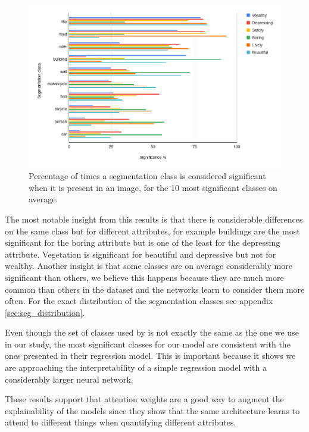 \begin{figure}[ht]
	\begin{center}
	\includegraphics[width=1\textwidth]{./figures/present_significance.png}
	\caption[Percentage of class significance when present]{
		Percentage of times a segmentation class is considered significant when it is present in an image, for the
		10 most significant classes on average.
        }
	\label{fig:presence_sig}
	\end{center}
\end{figure}


The most notable insight from this results is that there is considerable differences on the same class
but for different attributes, for example buildings are the most significant for the boring attribute
but is one of the least for the depressing attribute. Vegetation is significant for beautiful and
depressive but not for wealthy. Another insight is that some classes are on average considerably more significant
than others, we believe this happens because they are much more common than others in the dataset
and the networks learn to consider them more often. For the exact distribution of the segmentation classes
see appendix \ref{sec:seg_distribution}.

Even though the  set of classes used by  is not exactly the same as
the one we use in our study, the most significant classes for our model are consistent with
the ones presented in their regression model. This is important because it shows we
are approaching the interpretability of a simple regression model with a considerably larger
neural network.

These results support that attention weights are a good way to augment the explainability of
the models since they show that the same architecture learns to attend to different things
when quantifying different attributes.



